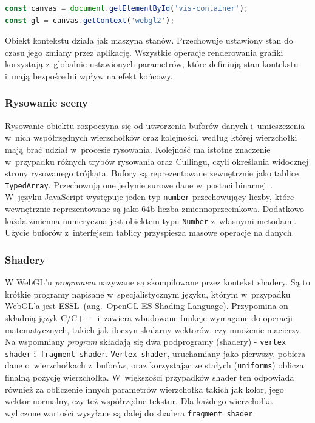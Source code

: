 \begin{lstlisting}[language=javascript, label={lst:webglContext}, caption={Pobranie kontekstu API WebGL do zmiennej}]
const canvas = document.getElementById('vis-container');
const gl = canvas.getContext('webgl2');
\end{lstlisting}

Obiekt kontekstu działa jak maszyna stanów. Przechowuje ustawiony stan do czasu jego zmiany przez aplikację. Wszystkie operacje renderowania grafiki korzystają z~globalnie ustawionych parametrów, które definiują stan kontekstu i~mają bezpośredni wpływ na efekt końcowy\cite[Rozdział 1]{RealTime3DGraphics}.

\subsubsection{Rysowanie sceny}
\label{sec:render}
Rysowanie obiektu rozpoczyna się od utworzenia buforów danych i~umieszczenia w~nich współrzędnych wierzchołków oraz kolejności, według której wierzchołki mają brać udział w~procesie rysowania. Kolejność ma istotne znaczenie w~przypadku różnych trybów rysowania oraz Cullingu, czyli określania widocznej strony rysowanego trójkąta. Bufory są reprezentowane zewnętrznie jako tablice \texttt{TypedArray}. Przechowują one jedynie surowe dane w~postaci binarnej~\cite{TypedArrays}. W~języku JavaScript występuje jeden typ \texttt{number} przechowujący liczby, które wewnętrznie reprezentowane są jako 64b liczba zmiennoprzecinkowa. Dodatkowo każda zmienna numeryczna jest obiektem typu \texttt{Number} z~własnymi metodami. Użycie buforów z~interfejsem tablicy przyspiesza masowe operacje na danych.

\subsubsection{Shadery}

W WebGL'u \textit{programem} nazywane są skompilowane przez kontekst shadery. Są to krótkie programy napisane w~specjalistycznym języku, którym w~przypadku WebGL'a jest ESSL~(ang.~OpenGL ES Shading Language). Przypomina on składnią język C/C++~\cite{ESSL} i~zawiera wbudowane funkcje wymagane do operacji matematycznych, takich jak iloczyn skalarny wektorów, czy mnożenie macierzy. Na wspomniany \textit{program} składają się dwa podprogramy (shadery) - \texttt{vertex shader} i~\texttt{fragment shader}. \texttt{Vertex shader}, uruchamiany jako pierwszy, pobiera dane o~wierzchołkach z~buforów, oraz korzystając ze stałych (\texttt{uniforms}) oblicza finalną pozycję wierzchołka. W~większości przypadków shader ten odpowiada również za obliczenie innych parametrów wierzchołka takich jak kolor, jego wektor normalny, czy też współrzędne tekstur. Dla każdego wierzchołka wyliczone wartości wysyłane są dalej do shadera \texttt{fragment shader}.

